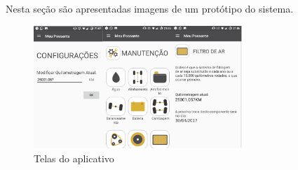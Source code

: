 \documentclass[12pt]{article}
\begin{document}
Nesta seção são apresentadas imagens de um protótipo do sistema.

\begin{figure}[h]
\centering
\includegraphics[width=0.7\textwidth]{telas}
\caption{Telas do aplicativo}
\label{figura-quilometragem}
\end{figure}


%
\end{document}
